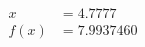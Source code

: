 \documentclass[preview]{standalone}
\begin{document}
\begin{align*}
x &= 4.7777\\f(x) &= 7.9937460
\end{align*}
\end{document}
